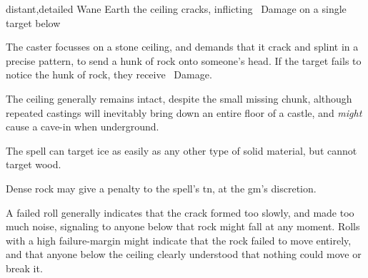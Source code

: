   {distant,detailed}%
  {Wane}%
  {Earth}%
  {}%
  {the ceiling cracks, inflicting \rollConv\ Damage on a single target below}%
  {
    The caster focusses on a stone ceiling, and demands that it crack and splint in a precise pattern, to send a hunk of rock onto someone's head.
    If the target fails to notice the hunk of rock, they receive \rollConv\ Damage.

    The ceiling generally remains intact, despite the small missing chunk, although repeated castings will inevitably bring down an entire floor of a castle, and \emph{might} cause a cave-in when underground.

    The spell can target ice as easily as any other type of solid material, but cannot target wood.

    Dense rock may give a penalty to the spell's \gls{tn}, at the \gls{gm}'s discretion.

    A failed roll generally indicates that the crack formed too slowly, and made too much noise, signaling to anyone below that rock might fall at any moment.
    Rolls with a high failure-margin might indicate that the rock failed to move entirely, and that anyone below the ceiling clearly understood that nothing could move or break it.
  }

